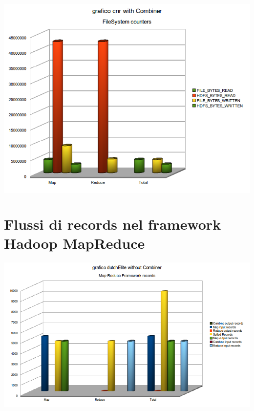 \documentclass[a4paper,11pt]{report}
\begin{document}
\paragraph{}
\centerline{\includegraphics[width=150mm]{images/grafici/cnrCombFS.png}}

\section{Flussi di records nel framework Hadoop MapReduce}
\paragraph{}
\centerline{\includegraphics[width=180mm]{images/grafici/deMRRec.png}}
\end{document}
